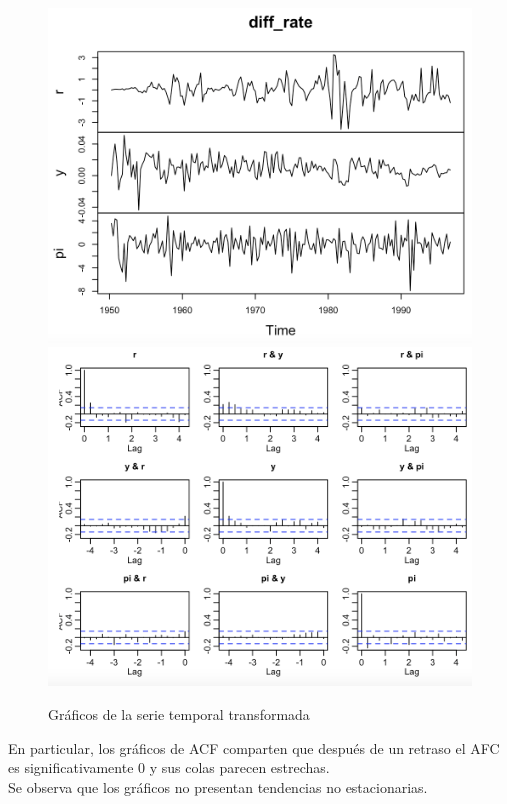 \documentclass[a4paper,]{article}
\begin{document}
\begin{figure}[H]
    \centering
    \includegraphics[scale=0.4]{dif_rate.png}
    \includegraphics[scale=0.4]{diff_acf.png}
    \caption*{Gráficos de la serie temporal transformada}
\end{figure}

En particular, los gráficos de ACF comparten que después de un retraso el AFC es significativamente 0 y sus colas parecen estrechas.\\

Se observa que los gráficos no presentan tendencias no estacionarias.\\
\end{document}
